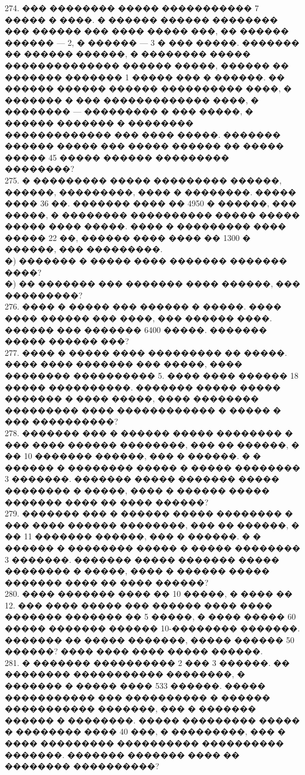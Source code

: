 \documentclass[12pt]{article}
\begin{document}
274. ��� �������� ����� ����������� 7 ����� � ����. � ������ ������ �������� ��� ������ ��� ���� ����� ���, �� ������ ������ --- 2, � ������ --- 3 � ��� �����. ������� �� ������ ������, � �������� ����� �������������� ������ �����, ������ �� ������� ������� 1 ����� ��� � ������. �� ������ ������ ������ ���������� ����, � ������� � ��� ������������� ����, � ��������  --- ��������� � ��� �����, � ������ ������� � �������� ������������� ��� ���� �����. ������� ������ ����� ��� ����� ������ �� ����� ����� 45 ����� ������ ��������� ��������?\\
275. � ��������� ����� ��������� ������, ������, ���������, ���� � ��������. ����� ���� 36 ��. ������� ���� �� 4950 � ������, ��� �����, � �������� ���������� ����� ����� ����� ���� �����. ���� � ��������� ���� ����� 22 ��, ������ ���� ���� �� 1300 � ������, ��� ���������.\\
�) ������� � ����� ���� ������� ������� ����?\\
�) �� ������� ��� ������� ���� ������, ��� ���������?\\
276. ���� � ����� ��� ������ � �����. ���� ���� ������ ��� ����, ��� ������ ����. ������ ��� ������� 6400 �����. ������� ����� ������ ���?\\
277. ���� � ����� ���� ��������� �� �����. ���� ���� ������� ��� �����, ���� �������� ���������� 5. ���� ���� ������ 18 ����� ����������. ������� ����� ����� ������� � ���� �����, ���� �������� ��������� ���� ������������ � ����� � ��� ����������?\\
278. ������� ��� � ������ ����� �������� � ��� ���� ������ ��������, ��� �� ������, � �� 10 ������� ������, ��� � ������. � � ������ � �������� ����� � ����� �������� 3 �������. ������� ����� ������� ����� �������� � �����, ���� � ������ ����� ������� ���� �� ���� ������?\\
279. ������� ��� � ������ ����� �������� � ��� ���� ������ ��������, ��� �� ������, � �� 11 ������� ������, ��� � ������. � � ������ � �������� ����� � ����� �������� 3 �������. ������� ����� ������� ����� �������� � �����, ���� � ������ ����� ������� ���� �� ���� ������?\\
280. ���� ������� ���� �� 10 �����, � ���� �� 12. ��� ���� ����� ��� ������ ���� ���� ������� ������� �� 5 �����, � ���� ����� 60 ����� ������� ������ 10-�������� �������. ������� �� ����� �������, ����� ������ 50 ������? ���� ���� ���� ����� ������.\\
281. � ������� ���������� 2 ��� 3 ������. �� �������� ����������� ��������, � ������� � ����� ���� 533 ������. ����� ����������� ��� ���������� � ������ ����������� �������, ��� � ������� ������ � ��������. ����� ��������� ����� � �������� ���� 40 ���, � ���������, ��� � ���� ��������� ���������� ���������� �������. ������� ������� ���� �� �������� ����������?\\
\end{document}
